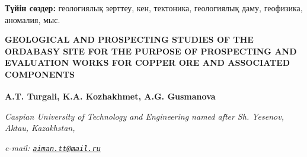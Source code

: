 {\bfseries Түйін сөздер:} геологиялық зерттеу, кен, тектоника, геологиялық
даму, геофизика, аномалия, мыс.

\begin{articleheader}
{\bfseries GEOLOGICAL AND PROSPECTING STUDIES OF THE ORDABASY SITE FOR THE PURPOSE OF PROSPECTING AND EVALUATION WORKS FOR COPPER ORE AND ASSOCIATED COMPONENTS}

{\bfseries
A.T. Turgali\textsuperscript{\envelope },
K.A. Kozhakhmet,
A.G. Gusmanova}
\end{articleheader}

\begin{affiliation}
\emph{Caspian University of Technology and Engineering named after Sh. Yesenov, Aktau, Kazakhstan,}

\emph{e-mail: \href{mailto:aiman.tt@mail.ru}{\nolinkurl{aiman.tt@mail.ru}}}
\end{affiliation}

